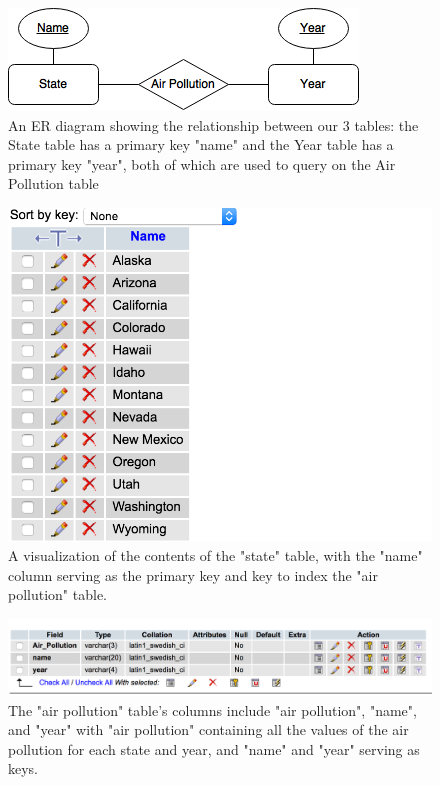 \documentclass[journal]{vgtc}                %
\begin{document}
\begin{figure}
 \centering %
 \includegraphics[width=\columnwidth]{cs458-ER-diagram-ass1}
 \caption{An ER diagram showing the relationship between our 3 tables: the State table has a primary key "name" and the Year table has a primary key "year", both of which are used to query on the Air Pollution table}
 \label{fig:ERdiagram}
\end{figure}


\begin{figure}
\centering
\includegraphics[width=\columnwidth]{state_db}
\caption{A visualization of the contents of the "state" table, with the "name" column serving as the primary key and key to index the "air pollution" table.}
\label{fig:stateDB}
\end{figure}

\begin{figure}
\centering
\includegraphics[width=\columnwidth]{air_poll_db}
\caption{The "air pollution" table's columns include "air pollution", "name", and "year" with "air pollution" 
containing all the values of the air pollution for each state and year, and "name" and "year" serving as keys.}
\label{fig:airPoll}
\end{figure}
\end{document}
